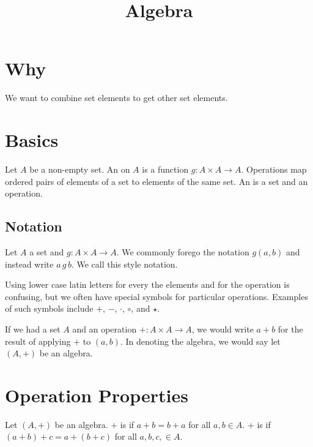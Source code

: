 






\title{Algebra}

\section{Why}

We want to combine set elements to get other set elements.

\section{Basics}


Let $A$ be a non-empty set.
An  on $A$ is a function $g: A \times A \to A$.
Operations map ordered pairs of elements of a set to elements of the same set.
An  is a set and an operation.


\subsection{Notation}

Let $A$ a set and $g: A \times A \to A$.
We commonly forego the notation $g(a, b)$ and instead write $a\,g\,b$.
We call this style  notation.

Using lower case latin letters for every the elements and for the operation is confusing, but we often have special symbols for particular operations.
Examples of such symbols include $+$, $-$, $\cdot$, $\circ$, and $\star$.

If we had a set $A$ and an operation $+: A \times A \to A$, we would write $a+b$ for the result of applying $+$ to $(a,b)$.
In denoting the algebra, we would say let $(A, +)$ be an algebra.

\section{Operation Properties}

Let $(A, +)$ be an algebra.
$+$ is  if $a + b = b + a$ for all $a, b \in A$.
$+$ is  if $(a + b) + c = a + (b + c)$ for all $a, b, c, \in A$.



